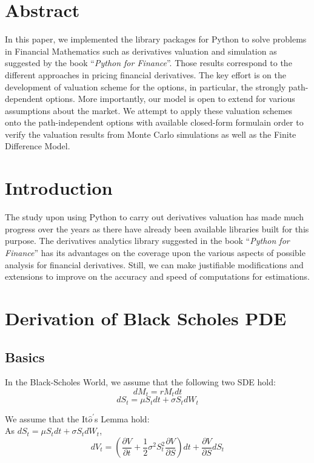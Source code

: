 \section*{Abstract}
In this paper, we implemented the library packages for Python to solve problems in Financial Mathematics such as derivatives valuation and simulation as suggested by the book ``\emph{Python for Finance}''. Those results correspond to the different approaches in pricing financial derivatives. The key effort is on the development of valuation scheme for the options, in particular, the strongly path-dependent options. More importantly, our model is open to extend for various assumptions about the market. We attempt to apply these valuation schemes onto the path-independent options with available closed-form formulain order to verify the valuation results from Monte Carlo simulations as well as the Finite Difference Model.

\section{Introduction}
The study upon using Python to carry out derivatives valuation has made much progress over the years as there have already been available libraries built for this purpose. The derivatives analytics library suggested in the book ``\emph{Python for Finance}'' has its advantages on the coverage upon the various aspects of possible analysis for financial derivatives. Still, we can make justifiable modifications and extensions to improve on the accuracy and speed of computations for estimations. 
\\

\newpage

\section{Derivation of Black Scholes PDE}

\subsection{Basics}
\begin{center}
In the Black-Scholes World, we assume that the following two SDE hold:
$$dM_{t}  = rM_{t}dt$$
$$dS_{t}  = \mu S_{t}dt + \sigma S_{t} dW_{t}$$

We assume that the It$\hat{o}^{\prime}$s Lemma hold:\\[4mm]
As $dS_{t} = \mu S_{t}dt + \sigma S_{t}dW_{t}$,
$$dV_{t} = (\frac{\partial V}{\partial t}+\frac{1}{2}\sigma^{2}S_{t}^{2}\frac{\partial V}{\partial S})dt + \frac{\partial V}{\partial S}dS_{t}$$
\end{center}
\newpage


